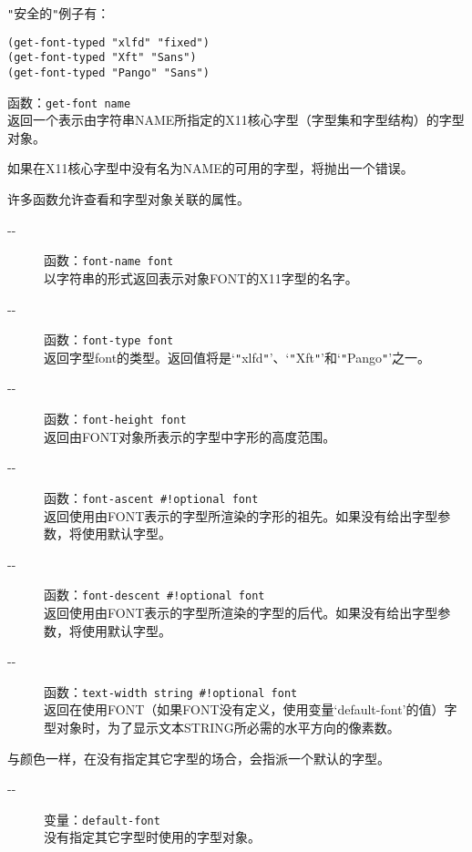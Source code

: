 \documentclass{book}
\begin{document}
\begin{CJK*}{UTF8}{gbsn}
\begin{description}
\verb|"|安全的\verb|"|例子有：
\begin{verbatim}
(get-font-typed "xlfd" "fixed")
(get-font-typed "Xft" "Sans")
(get-font-typed "Pango" "Sans")
\end{verbatim}
\item[-{}-] 函数：\verb|get-font name|\\
返回一个表示由字符串NAME所指定的X11核心字型（字型集和字型结构）的字型对象。

如果在X11核心字型中没有名为NAME的可用的字型，将抛出一个错误。
\end{description}

许多函数允许查看和字型对象关联的属性。
\begin{description}
\item[-{}-] 函数：\verb|font-name font|\\
以字符串的形式返回表示对象FONT的X11字型的名字。
\item[-{}-] 函数：\verb|font-type font|\\
返回字型font的类型。返回值将是`\verb|"|xlfd\verb|"|'、`\verb|"|Xft\verb|"|'和`\verb|"|Pango\verb|"|'之一。
\item[-{}-] 函数：\verb|font-height font|\\
返回由FONT对象所表示的字型中字形的高度范围。
\item[-{}-] 函数：\verb|font-ascent #!optional font|\\
返回使用由FONT表示的字型所渲染的字形的祖先。如果没有给出字型参数，将使用默认字型。
\item[-{}-] 函数：\verb|font-descent #!optional font|\\
返回使用由FONT表示的字型所渲染的字型的后代。如果没有给出字型参数，将使用默认字型。
\item[-{}-] 函数：\verb|text-width string #!optional font|\\
返回在使用FONT（如果FONT没有定义，使用变量`default-font'的值）字型对象时，为了显示文本STRING所必需的水平方向的像素数。
\end{description}

与颜色一样，在没有指定其它字型的场合，会指派一个默认的字型。
\begin{description}
\item[-{}-] 变量：\verb|default-font|\\
没有指定其它字型时使用的字型对象。
\end{description}


\end{CJK*}
\end{document}
